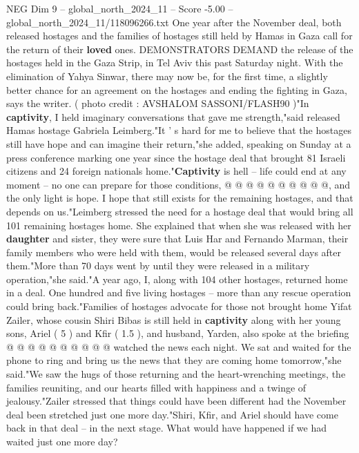 \begin{textsample}{NEG Dim 9 – global\_north\_2024\_11 – Score -5.00 – global\_north\_2024\_11/118096266.txt}  \label{ex:f9_neg_209}
One year after the November deal, both released hostages and the families of hostages still held by Hamas in Gaza call for the return of their \textbf{loved} ones.
DEMONSTRATORS DEMAND the release of the hostages held in the Gaza Strip, in Tel Aviv this past Saturday night.
With the elimination of Yahya Sinwar, there may now be, for the first time, a slightly better chance for an agreement on the hostages and ending the fighting in Gaza, says the writer. ( photo credit : AVSHALOM SASSONI/FLASH90 )"In \textbf{captivity}, I held imaginary conversations that gave me strength,"said released Hamas hostage Gabriela Leimberg."It ' s hard for me to believe that the hostages still have hope and can imagine their return,"she added, speaking on Sunday at a press conference marking one year since the hostage deal that brought 81 Israeli citizens and 24 foreign nationals home."\textbf{Captivity} is hell -- life could end at any moment -- no one can prepare for those conditions, @ @ @ @ @ @ @ @ @ @, and the only light is hope.
I hope that still exists for the remaining hostages, and that depends on us."Leimberg stressed the need for a hostage deal that would bring all 101 remaining hostages home.
She explained that when she was released with her \textbf{daughter} and sister, they were sure that Luis Har and Fernando Marman, their family members who were held with them, would be released several days after them."More than 70 days went by until they were released in a military operation,"she said."A year ago, I, along with 104 other hostages, returned home in a deal.
One hundred and five living hostages -- more than any rescue operation could bring back."Families of hostages advocate for those not brought home Yifat Zailer, whose cousin Shiri Bibas is still held in \textbf{captivity} along with her young sons, Ariel ( 5 ) and Kfir ( 1.5 ), and husband, Yarden, also spoke at the briefing @ @ @ @ @ @ @ @ @ @ watched the news each night.
We sat and waited for the phone to ring and bring us the news that they are coming home tomorrow,"she said."We saw the hugs of those returning and the heart-wrenching meetings, the families reuniting, and our hearts filled with happiness and a twinge of jealousy."Zailer stressed that things could have been different had the November deal been stretched just one more day."Shiri, Kfir, and Ariel should have come back in that deal -- in the next stage.
What would have happened if we had waited just one more day?

\end{textsample}
